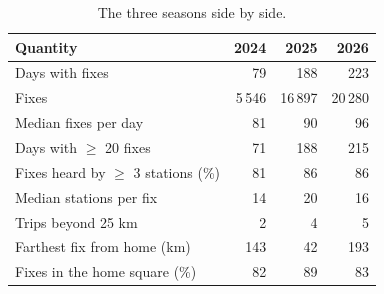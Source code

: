 \begin{table}[htbp]\centering\small
\caption{The three seasons side by side.}\label{tab:wseasons}
\begin{tabular}{lrrr}
\toprule
Quantity & 2024 & 2025 & 2026 \\
\midrule
Days with fixes & 79 & 188 & 223 \\
Fixes & 5\,546 & 16\,897 & 20\,280 \\
Median fixes per day & 81 & 90 & 96 \\
Days with $\geq$ 20 fixes & 71 & 188 & 215 \\
Fixes heard by $\geq$ 3 stations (\%) & 81 & 86 & 86 \\
Median stations per fix & 14 & 20 & 16 \\
Trips beyond 25 km & 2 & 4 & 5 \\
Farthest fix from home (km) & 143 & 42 & 193 \\
Fixes in the home square (\%) & 82 & 89 & 83 \\
\bottomrule
\end{tabular}
\end{table}
